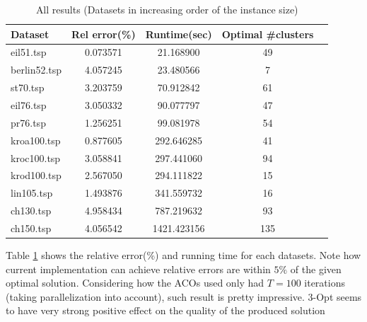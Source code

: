 \documentclass[a4paper]{article}
\begin{document}
{\begin{table}[t!]
	\caption{All results (Datasets in increasing order of the instance size)}
	\label{table:results}
	\vskip 0.15in
	\begin{center}
		\begin{small}
			\begin{sc}
				\begin{tabular}{l|cccr}
					\toprule
					Dataset & Rel error(\%) & Runtime(sec) & Optimal \#clusters \\ \midrule
					eil51.tsp & 0.073571 & 21.168900 & 49 \\
					berlin52.tsp & 4.057245 & 23.480566 & 7 \\
					st70.tsp & 3.203759 & 70.912842 & 61 \\
					eil76.tsp & 3.050332 & 90.077797 & 47 \\
					pr76.tsp & 1.256251 & 99.081978 & 54 \\
					kroa100.tsp & 0.877605 & 292.646285 & 41 \\
					kroc100.tsp & 3.058841 & 297.441060 & 94 \\
					krod100.tsp & 2.567050 & 294.111822 & 15 \\
					lin105.tsp & 1.493876 & 341.559732 & 16 \\
					ch130.tsp & 4.958434 & 787.219632 & 93 \\
					ch150.tsp & 4.056542 & 1421.423156 & 135 \\
					\bottomrule
				\end{tabular}
			\end{sc}
		\end{small}
	\end{center}
	\vskip -0.1in
\end{table}



Table \ref{table:results} shows the relative error(\%) and running time for each datasets.
Note how current implementation can achieve relative errors are within $5\%$ of the given optimal solution.
Considering how the ACOs used only had $T=100$ iterations (taking parallelization into account), such result is pretty impressive.
3-Opt seems to have very strong positive effect on the quality of the produced solution


}
\end{document}
